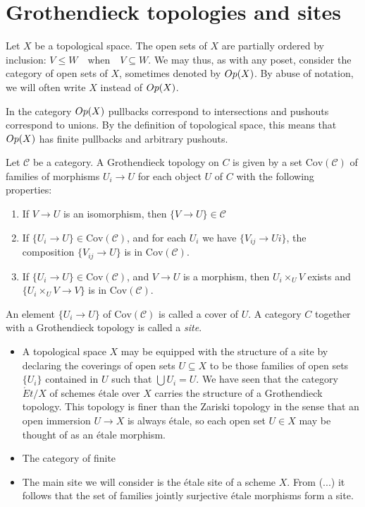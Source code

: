 \section{Grothendieck topologies and sites}
\begin{construction}[h]\label{def:opens}
  Let $X$ be a topological space. The open sets of $X$ are partially ordered by inclusion: $V \le W \quad \text{when} \quad V \subseteq W$.  We may thus, as with any poset, consider the category of open sets of $X$, sometimes denoted by $Op(X)$. By abuse of notation, we will often write $X$ instead of $Op(X)$.
\end{construction}
\begin{remark}
  In the category $Op(X)$ pullbacks correspond to intersections and pushouts correspond to unions. By the definition of topological space, this means that $Op(X)$ has finite pullbacks and arbitrary pushouts. 
\end{remark}

\begin{definition}
	Let $\mathcal{C}$ be a category. A Grothendieck topology on $C$ is given by a set $\text{Cov}(\mathcal{C})$ of families of morphisms ${U_i \to U}$ for each object $U$ of $C$ with the following properties:
	\begin{enumerate}
		\item If $V \to U$ is an isomorphism, then $\{V \to U\} \in \mathcal{C}$
		\item If $\{U_i \to U\} \in \text{Cov}(\mathcal{C})$, and for each $U_i$ we have $\{V_{ij} \to Ui\}$, the composition $\{V_{ij} \to U\}$ is in $\text{Cov}(\mathcal{C})$.
		\item If $\{U_i \to U\} \in \text{Cov}(\mathcal{C})$, and $V \to U$ is a morphism, then $U_i \times_U V$ exists and 
		$\{U_i \times_U V \to V\}$ is in $\text{Cov}(\mathcal{C})$.
	\end{enumerate}	
	An element $\{U_i \to U\}$ of $\text{Cov}(\mathcal{C})$ is called a cover of $U$. A category $C$ together with a Grothendieck topology is called a \textit{site}.
\end{definition}

\begin{itemize}
	\item	A topological space $X$ may be equipped with the structure of a site by declaring the coverings of open sets $U \subseteq X$ to be those families of open sets $\{U_i\}$ contained in $U$ such that $\bigcup U_i = U$. We have seen that the category $\acute{E}t/X$ of schemes \'etale over $X$ carries the structure of a Grothendieck topology. This topology is finer than the Zariski topology in the sense that an open immersion $U \to X$ is always \'etale, so each open set $U \in X$ may be thought of as an \'etale morphism.
	\item The category of finite
	\item The main site we will consider is the \'etale site of a scheme $X$. From (...) it follows that the set of families jointly surjective \'etale morphisms form a site.
\end{itemize}



